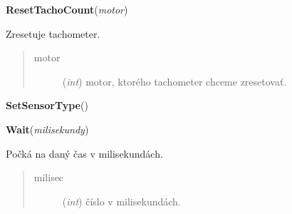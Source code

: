 \documentclass[10pt,a4paper]{article}
\begin{document}
 

\vspace{6pt}
{\bf ResetTachoCount}({\it motor}) 
    
    Zresetuje tachometer. 


    

\begin{quote}
    \begin{description}
        
\item[motor] ({\emph{int}}) motor, ktorého tachometer chceme zresetovať.

    \end{description}
\end{quote}

 

\vspace{6pt}
{\bf SetSensorType}({\it }) 

 

\vspace{6pt}
{\bf Wait}({\it milisekundy}) 
    
    Počká na daný čas v milisekundách.


    

\begin{quote}
    \begin{description}
        
\item[milisec] ({\emph{int}}) číslo v milisekundách.

    \end{description}
\end{quote}

 
\end{document}
